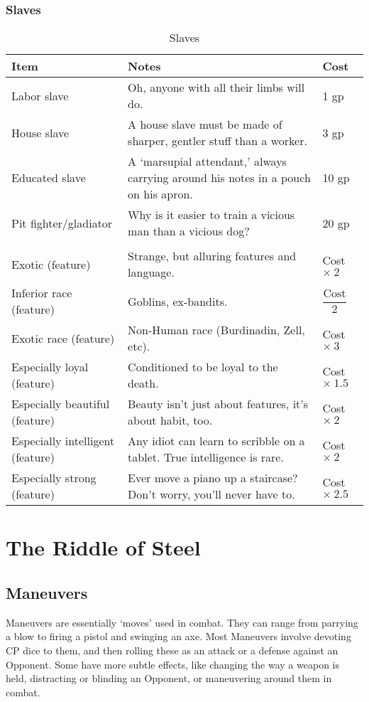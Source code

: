 \documentclass[oneside,11pt,english]{book}
\begin{document}
\section{Slaves}
\begin{table}[hb]
	\centering
	\caption{Slaves}
	\label{tab:Slaves}
	\begin{tabu} spread 0pt {*{3}{X[-1]}}
		Item &Notes &Cost\\\toprule
Labor slave &Oh, anyone with all their limbs will do. &1 gp\\
House slave &A house slave must be made of sharper, gentler stuff than a worker. &3 gp\\
Educated slave &A ‘marsupial attendant,’ always carrying around his notes in a pouch on his apron. &10 gp\\
Pit fighter/gladiator &Why is it easier to train a vicious man than a vicious dog? &20 gp\\
	\\
Exotic (feature) &Strange, but alluring features and language. &Cost $\times\ 2 $\\
Inferior race (feature) &Goblins, ex-bandits. &$ \dfrac{\text{Cost}}{2} $\\
Exotic race (feature) &Non-Human race (Burdinadin, Zell, etc). &Cost $ \times\ 3$\\
Especially loyal (feature) &Conditioned to be loyal to the death. &Cost $ \times\ 1.5 $\\
Especially beautiful (feature) &Beauty isn’t just about features, it’s about habit, too. &Cost $ \times\ 2 $\\
Especially intelligent (feature) &Any idiot can learn to scribble on a tablet. True intelligence is rare. &Cost $ \times\ 2 $\\
Especially strong (feature) &Ever move a piano up a staircase? Don’t worry, you’ll never have to. &Cost $ \times\ 2.5 $\\
	\end{tabu}
\end{table}

\part[Game Mechanics]{The Riddle of Steel}

\chapter{Maneuvers}\label{ch:Maneuvers} %
\startcontents[chapters]
\clearpage
Maneuvers are essentially ‘moves’ used in combat. They can range from parrying a blow to firing a pistol and swinging an axe. Most Maneuvers involve devoting CP dice to them, and then rolling these as an attack or a defense against an Opponent. Some have more subtle effects, like changing the way a weapon is held, distracting or blinding an Opponent, or maneuvering around them in combat.
\end{document}
